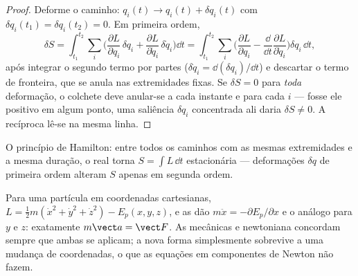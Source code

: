 \begin{proof}
Deforme o caminho: $q_i(t) \to q_i(t) + \delta q_i(t)$ com
$\delta q_i(t_1) = \delta q_i(t_2) = 0$. Em primeira ordem,
\[
\delta S = \int_{t_1}^{t_2}\sum_i\Big(
  \frac{\partial L}{\partial q_i}\,\delta q_i
 + \frac{\partial L}{\partial\dot q_i}\,\delta\dot q_i\Big)\dd t
 = \int_{t_1}^{t_2}\sum_i\Big(
  \frac{\partial L}{\partial q_i}
 - \frac{\dd}{\dd t}\frac{\partial L}{\partial\dot q_i}\Big)\delta q_i\,\dd t ,
\]
após integrar o segundo termo por partes ($\delta\dot q_i =
\dd(\delta q_i)/\dd t$) e descartar o termo de fronteira, que se anula
nas extremidades fixas. Se $\delta S = 0$ para \emph{toda} deformação,
o colchete deve anular-se a cada instante e para cada $i$ --- fosse ele
positivo em algum ponto, uma saliência $\delta q_i$ concentrada ali
daria $\delta S \neq 0$. A recíproca lê-se na mesma linha.
\end{proof}

\begin{omfigure}

{\small O princípio de Hamilton: entre todos os caminhos com as mesmas
extremidades e a mesma duração, o real torna $S = \int L\,\dd t$
estacionária --- deformações $\delta q$ de primeira ordem alteram $S$
apenas em segunda ordem.}
\end{omfigure}

\begin{proposition}\label{prop:b3:lagrangian-mechanics:newton}
Para uma partícula em coordenadas cartesianas, $L = \tfrac12 m(\dot x^2 +
\dot y^2 + \dot z^2) - E_p(x,y,z)$, e as 
dão $m\ddot x = -\partial E_p/\partial x$ e o análogo para $y$ e $z$:
exatamente $m\vect a = \vect F$. As mecânicas  e newtoniana
concordam sempre que ambas se aplicam; a nova forma simplesmente
sobrevive a uma mudança de coordenadas, o que as equações em
componentes de Newton não fazem.
\end{proposition}

